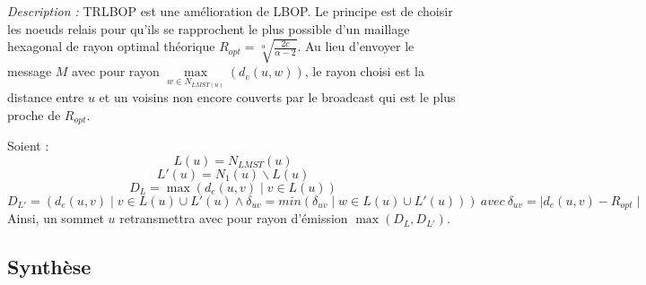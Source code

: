 \emph{Description :} TRLBOP est une amélioration de LBOP. Le principe est de choisir les noeuds relais pour qu'ils se rapprochent le plus possible d'un maillage hexagonal de rayon optimal théorique $R_{opt}=\sqrt[\alpha]{\frac{2c}{\alpha-2}}$. Au lieu d'envoyer le message $M$ avec pour rayon $\max\limits_{w\in N_{LMST(u)}}(d_e(u,w))$, le rayon choisi est la distance entre $u$ et un voisins non encore couverts par le broadcast qui est le plus proche de $R_{opt}$.

Soient : 
$$L(u)= N_{LMST}(u)$$
$$L'(u)=N_1(u)\backslash L(u)$$
$$D_L=\max(d_e(u,v)\mid v \in L(u))$$
$$D_{L'}=(d_e(u,v)\mid v \in L(u)\cup L'(u)\wedge \delta_{uv}=min(\delta_{uv}\mid w \in L(u)\cup L'(u)))\ avec\ \delta_{uv}=\mid d_e(u,v)-R_{opt}\mid$$
Ainsi, un sommet $u$ retransmettra avec pour rayon d'émission $\max(D_L,D_{L'})$.


\subsection{Synthèse}


